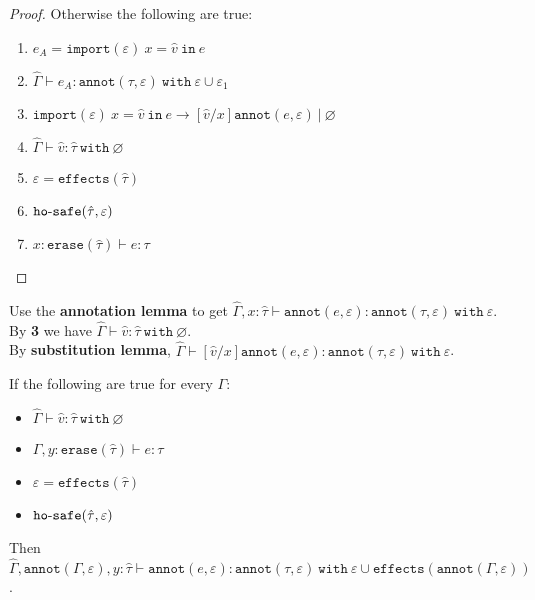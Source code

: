 \documentclass{llncs}
\newcommand{\keywadj}[1]{\mathtt{#1}}
\newcommand{\keyw}[1]{\keywadj{#1}~}
\newcommand{\kw}[1]{\keyw{ #1 }}
\newcommand{\kwa}[1]{\keywadj{ #1 }}
\newcommand{\hyphen}{\hbox{-}}
\begin{document}
\begin{proof}
Otherwise the following are true:
\begin{enumerate}
	\item $e_A = \kwa{import}(\varepsilon)~x = \hat v~\kw{in} e$
	\item $\hat \Gamma \vdash e_A: \kwa{annot}(\tau, \varepsilon)~\kw{with} \varepsilon \cup \varepsilon_1$
	\item $\kwa{import}(\varepsilon)~x = \hat v~\kw{in} e \longrightarrow [\hat v/x]\kwa{annot}(e, \varepsilon)~|~\varnothing$
	\item $\hat \Gamma \vdash \hat v: \hat \tau~\kw{with} \varnothing$
	\item $\varepsilon = \kwa{effects}(\hat \tau)$
	\item $\kwa{ho \hyphen safe}(\hat \tau, \varepsilon)$
	\item $x: \kwa{erase}(\hat \tau) \vdash e: \tau$
\end{enumerate}

\end{proof}

\noindent
Use the \textbf{annotation lemma} to get $\hat \Gamma, x: \hat \tau \vdash \kwa{annot}(e, \varepsilon): \kwa{annot}(\tau, \varepsilon)~\kw{with} \varepsilon$. \\

\noindent
By \textbf{3} we have $\hat \Gamma \vdash \hat v: \hat \tau~\kw{with} \varnothing$. \\

\noindent
By \textbf{substitution lemma}, $\hat \Gamma \vdash [\hat v/x]\kwa{annot}(e, \varepsilon): \kwa{annot}(\tau, \varepsilon)~\kw{with} \varepsilon$.

\hrulefill

\begin{lemma}[Annotation]
If the following are true for every $\Gamma$:

\begin{itemize}
	\item $\hat \Gamma \vdash \hat v : \hat \tau~\kw{with} \varnothing$
	\item $\Gamma, y: \kwa{erase}(\hat \tau) \vdash e: \tau$
	\item $\varepsilon = \kwa{effects}(\hat \tau)$
	\item $\kwa{ho \hyphen safe}(\hat \tau, \varepsilon)$
\end{itemize}

\noindent
Then $\hat \Gamma, \kwa{annot}(\Gamma, \varepsilon), y: \hat \tau \vdash \kwa{annot}(e, \varepsilon) : \kwa{annot}(\tau, \varepsilon)~\kw{with} \varepsilon \cup \kwa{effects}(\kwa{annot}(\Gamma, \varepsilon))$.
\end{lemma}
\end{document}
